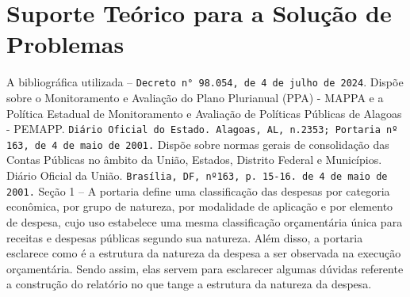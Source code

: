 \documentclass[12pt,a4paper]{article}
\begin{document}
	\section{Suporte Teórico para a Solução de Problemas}
\hspace*{1,5cm}A bibliográfica utilizada – \texttt{Decreto n° 98.054, de 4 de julho de 2024}. Dispõe sobre o 
Monitoramento e Avaliação do Plano Plurianual (PPA) - MAPPA e a Política Estadual de 
Monitoramento e Avaliação de Políticas Públicas de Alagoas - PEMAPP. \texttt{Diário Oficial do 
Estado. Alagoas, AL, n.2353; Portaria nº 163, de 4 de maio de 2001.} Dispõe sobre normas 
gerais de consolidação das Contas Públicas no âmbito da União, Estados, Distrito Federal e 
Municípios. Diário Oficial da União. \texttt{Brasília, DF, nº163, p. 15-16. de 4 de maio de 2001.} 
Seção 1 – A portaria define uma classificação das despesas por categoria econômica, por grupo 
de natureza, por modalidade de aplicação e por elemento de despesa, cujo uso estabelece uma 
mesma classificação orçamentária única para receitas e despesas públicas segundo sua natureza. 
Além disso, a portaria esclarece como é a estrutura da natureza da despesa a ser observada na 
execução orçamentária. Sendo assim, elas servem para esclarecer algumas dúvidas referente a 
construção do relatório no que tange a estrutura da natureza da despesa. %
	
\end{document}

